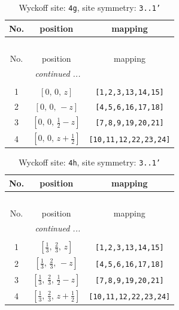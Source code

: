 \documentclass[fleqn,8pt]{jsarticle}
\begin{document}
\begin{longtable}{ccc}
\caption{Wyckoff site: {\tt 4g}, site symmetry: {\tt 3..1'}}
 \\
 \hline \hline
No. & position & mapping \\ \hline \endfirsthead

\multicolumn{2}{l}{\tablename\ \thetable{}} \\
 \hline \hline
No. & position & mapping \\ \hline \endhead

 \hline \hline
\multicolumn{2}{r}{\footnotesize\it continued ...} \\ \endfoot

 \hline \hline
\multicolumn{2}{r}{} \\ \endlastfoot

1 & $\left[ 0,\, 0,\, z \right]$ & {\tt [1,2,3,13,14,15]} \\ \hline
2 & $\left[ 0,\, 0,\, - z \right]$ & {\tt [4,5,6,16,17,18]} \\ \hline
3 & $\left[ 0,\, 0,\, \frac{1}{2} - z \right]$ & {\tt [7,8,9,19,20,21]} \\ \hline
4 & $\left[ 0,\, 0,\, z + \frac{1}{2} \right]$ & {\tt [10,11,12,22,23,24]} \\
\end{longtable}
\renewcommand{\arraystretch}{1.2}
\begin{longtable}{ccc}
\caption{Wyckoff site: {\tt 4h}, site symmetry: {\tt 3..1'}}
 \\
 \hline \hline
No. & position & mapping \\ \hline \endfirsthead

\multicolumn{2}{l}{\tablename\ \thetable{}} \\
 \hline \hline
No. & position & mapping \\ \hline \endhead

 \hline \hline
\multicolumn{2}{r}{\footnotesize\it continued ...} \\ \endfoot

 \hline \hline
\multicolumn{2}{r}{} \\ \endlastfoot

1 & $\left[ \frac{1}{3},\, \frac{2}{3},\, z \right]$ & {\tt [1,2,3,13,14,15]} \\ \hline
2 & $\left[ \frac{1}{3},\, \frac{2}{3},\, - z \right]$ & {\tt [4,5,6,16,17,18]} \\ \hline
3 & $\left[ \frac{1}{3},\, \frac{2}{3},\, \frac{1}{2} - z \right]$ & {\tt [7,8,9,19,20,21]} \\ \hline
4 & $\left[ \frac{1}{3},\, \frac{2}{3},\, z + \frac{1}{2} \right]$ & {\tt [10,11,12,22,23,24]} \\
\end{longtable}
\end{document}
